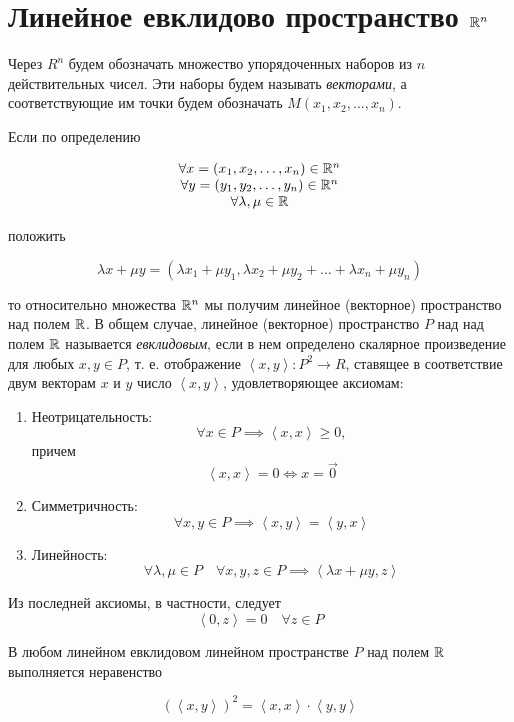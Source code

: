 \documentclass[../../main.tex]{subfiles}
\begin{document}
\section{Линейное евклидово пространство $\mathbb{R}^n$}

Через $R^n$ будем обозначать множество упорядоченных наборов из $n$
действительных чисел. Эти наборы будем называть \textit{векторами},
а соответствующие им точки будем обозначать $M(x_1, x_2, \dots, x_n)$.

Если по определению

\[
\begin{array}{c}
 \forall x = (x_1, x_2, \dots, x_n) \in \mathbb{R}^n \\
 \forall y = (y_1, y_2, \dots, y_n) \in \mathbb{R}^n \\
 \forall \lambda, \mu \in \mathbb{R}
\end{array}
\]

положить

\[\lambda x + \mu y = (\lambda x_1 + \mu y_1, \lambda x_2 + \mu y_2 + 
\dots + \lambda x_n + \mu y_n)\]

то относительно множества $\mathbb{R}^n$ мы получим линейное (векторное) 
пространство над полем $\mathbb{R}$. В общем случае, линейное (векторное) 
пространство $P$ над над полем $\mathbb{R}$ называется \textit{евклидовым},
если в нем определено скалярное произведение для любых $x, y \in P$, 
т. е. отображение $\left<x, y\right>: P^2 \to R$, ставящее в 
соответствие двум векторам $x$ и $y$ число $\left<x, y\right>$, 
удовлетворяющее аксиомам:

\begin{enumerate}
 \item Неотрицательность:
 \[\forall x \in P \implies \left<x, x\right> \ge 0,\]
 причем
 \[\left<x, x\right> = 0 \iff x = \vec 0\]
 \item Симметричность:
 \[\forall x, y \in P \implies \left<x, y\right> = \left<y, x\right>\]
 \item Линейность:
 \[\forall \lambda, \mu \in P \quad \forall x, y, z \in P \implies
 \left<\lambda x + \mu y, z\right>\]
\end{enumerate}

Из последней аксиомы, в частности, следует \[\left<0, z\right> = 0 
\quad \forall z \in P\]

\begin{thm}
 В любом линейном евклидовом линейном пространстве $P$ над полем $\mathbb{R}$
 выполняется неравенство
 
 \begin{equation}
  \label{kosh-bun}
  (\left<x, y\right>)^2 = \left<x, x\right>\cdot\left<y, y\right>
 \end{equation}
\end{thm}
\end{document}

